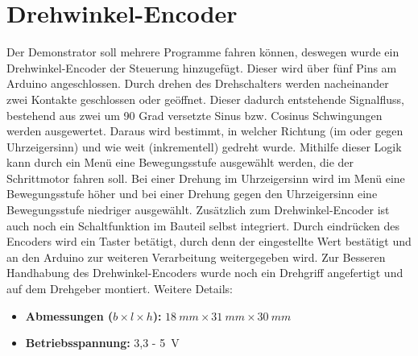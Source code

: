 \section{Drehwinkel-Encoder}
Der Demonstrator soll mehrere Programme fahren können, deswegen wurde ein Drehwinkel-Encoder der Steuerung hinzugefügt. Dieser wird über fünf Pins am Arduino angeschlossen. Durch drehen des Drehschalters werden nacheinander zwei Kontakte geschlossen oder geöffnet. Dieser dadurch entstehende Signalfluss, bestehend aus zwei um 90 Grad versetzte Sinus bzw. Cosinus Schwingungen werden ausgewertet. Daraus wird bestimmt, in welcher Richtung (im oder gegen Uhrzeigersinn) und wie weit (inkrementell) gedreht wurde. Mithilfe dieser Logik kann durch ein Menü eine Bewegungsstufe ausgewählt werden, die der Schrittmotor fahren soll.\cite{Basler.2016} Bei einer Drehung im Uhrzeigersinn wird im Menü eine Bewegungsstufe höher und bei einer Drehung gegen den Uhrzeigersinn eine Bewegungsstufe niedriger ausgewählt. Zusätzlich zum Drehwinkel-Encoder ist auch noch ein Schaltfunktion im Bauteil selbst integriert. Durch eindrücken des Encoders wird ein Taster betätigt, durch denn der eingestellte Wert bestätigt und an den Arduino zur weiteren Verarbeitung weitergegeben wird. Zur Besseren Handhabung des Drehwinkel-Encoders wurde noch ein Drehgriff angefertigt und auf dem Drehgeber montiert.
Weitere Details: \begin{itemize}
	\item \textbf{Abmessungen ($b \times l \times h$):} $18 \ mm \times 31 \ mm \times 30 \ mm$
	\item \textbf{Betriebsspannung:} 3,3 - 5\ V
	\cite{SimacElec.2019}
\end{itemize}
